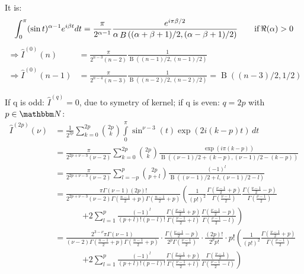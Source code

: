 \documentclass[
  english,		%
  a4paper,		%
  11pt,			%
  DIV=12,
  titlepage,
  toc=bibnumbered,
  parskip=full,  	%
  headings=normal,
  BCOR=12mm,
  numbers=noenddot
]{scrartcl}
\begin{document}
It is\cite[eq. 5.12.6]{NIST:DLMF}:
\begin{equation}
\int_{0}^{\pi}(\mathop{\sin\/}\nolimits t)^{\alpha-1}e^{i\beta t}dt=\frac{\pi}{2^{\alpha-1}} \frac{e^{i\pi \beta/2}}{\alpha\mathop{B}\left((\alpha+\beta+1)/2,(\alpha-\beta+1)/2\right)} \qquad\text{if}\,\Re(\alpha) > 0
\end{equation}
\begin{align}
\Rightarrow \hat I^{(0)}(n) &= \frac{\pi}{2^{n-3}(n-2)}\frac 1 {\mathop{B}((n-1)/2,(n-1)/2)}\\
\Rightarrow \hat I^{(0)}(n-1) &= \frac{\pi}{2^{n-4}(n-3)}\frac 1 {\mathop{B}((n-2)/2,(n-2)/2)}=\mathop{B}((n-3)/2,1/2)
\end{align}

If q is odd: $\hat I^{(q)}=0$, due to symetry of kernel; if q is even: $q=2p$ with $p\in\mathbbm N$:
\begin{align}
\hat I^{(2p)}(\nu) &= \frac 1 {2^{2p}}\sum\limits_{k=0}^{2p} \binom{2p}{k} \int\limits_0^\pi\sin^{\nu-3}(t)\exp(2i(k-p)t)\,dt\\
 &= \frac \pi{2^{2p+\nu-3} (\nu-2)}\sum\limits_{k=0}^{2p} \binom{2p}{k}\frac{\exp(i\pi(k-p))}{\mathop{B}((\nu-1)/2+(k-p),(\nu-1)/2-(k-p))}\\
 &= \frac \pi{2^{2p+\nu-3} (\nu-2)}\sum\limits_{l=-p}^{p} \binom{2p}{p+l}\frac{(-1)^l}{\mathop{B}((\nu-1)/2+l,(\nu-1)/2-l)}\\
 &= \frac {\pi\Gamma(\nu-1)(2p)!}{2^{2p+\nu-3} (\nu-2)\Gamma(\frac{n-1} 2+p)\Gamma(\frac{n-1} 2+p)}\left(\frac 1 {(p!)^2} \frac{\Gamma(\frac{\nu-1} 2+p)}{\Gamma(\frac{\nu-1} 2)}\frac{\Gamma(\frac{\nu-1} 2-p)}{\Gamma(\frac{\nu-1} 2)} \right. \nonumber\\
 &\hspace{40pt}\left. + 2\sum\limits_{l=1}^{p}\frac{(-1)^l}{(p+l)!(p-l)!}\frac{\Gamma(\frac{\nu-1} 2+p)}{\Gamma(\frac{\nu-1} 2+l)}\frac{\Gamma(\frac{\nu-1} 2-p)}{\Gamma(\frac{\nu-1} 2-l)}\right)\\
 &= \frac {2^{3-\nu}\pi\Gamma(\nu-1)}{(\nu-2)\Gamma(\frac{n-1} 2+p)\Gamma(\frac{n-1} 2+p)}\cdot \frac{\Gamma(\frac{\nu-1} 2-p)}{2^{p}\Gamma(\frac{\nu-1} 2)} \cdot \frac{(2p)!}{2^p p!} \cdot p! \left(\frac 1 {(p!)^2} \frac{\Gamma(\frac{\nu-1} 2+p)}{\Gamma(\frac{\nu-1} 2)} \right. \nonumber\\
 &\hspace{40pt}\left. + 2\sum\limits_{l=1}^{p}\frac{(-1)^l}{(p+l)!(p-l)!}\frac{\Gamma(\frac{\nu-1} 2+p)}{\Gamma(\frac{\nu-1} 2+l)}\frac{\Gamma(\frac{\nu-1} 2)}{\Gamma(\frac{\nu-1} 2-l)}\right)
\end{align}
\end{document}
